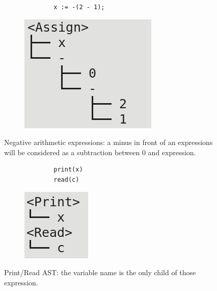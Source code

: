 \documentclass[letterpaper]{article}
\begin{document}
\begin{figure}[H]
    \begin{subfigure}{.5\textwidth}
        \begin{lstlisting}
        x := -(2 - 1);
        \end{lstlisting}
    \end{subfigure}
    \begin{subfigure}{.5\textwidth}
    \includegraphics[scale=0.5]{image/neg-assign.png}
\end{subfigure}
    \caption{Negative arithmetic expressions: a minus in front of an
    expressions will be considered as a subtraction between 0 and expression.}
\end{figure}

\begin{figure}[H]
    \begin{subfigure}{.5\textwidth}
        \begin{lstlisting}
        print(x)
        read(c)
        \end{lstlisting}
    \end{subfigure}
    \begin{subfigure}{.5\textwidth}
    \includegraphics[scale=0.5]{image/print-read.png}
\end{subfigure}
    \caption{Print/Read AST: the variable name is the only child of those
    expression.}
\end{figure}
\end{document}
